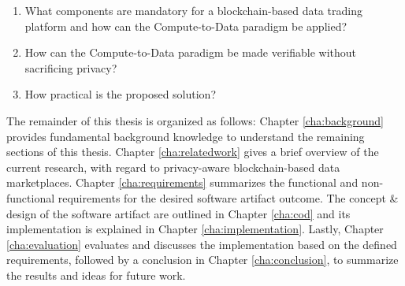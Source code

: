 \begin{enumerate}
    \item What components are mandatory for a blockchain-based data trading platform and how can the Compute-to-Data paradigm be applied?
    \item How can the Compute-to-Data paradigm be made verifiable without sacrificing privacy?
    \item How practical is the proposed solution?
\end{enumerate}

The remainder of this thesis is organized as follows: Chapter \ref{cha:background} provides fundamental background knowledge to understand the remaining sections of this thesis. Chapter \ref{cha:relatedwork} gives a brief overview of the current research, with regard to privacy-aware blockchain-based data marketplaces. Chapter \ref{cha:requirements} summarizes the functional and non-functional requirements for the desired software artifact outcome. The concept \& design of the software artifact are outlined in Chapter \ref{cha:cod} and its implementation is explained in Chapter \ref{cha:implementation}. Lastly, Chapter \ref{cha:evaluation} evaluates and discusses the implementation based on the defined requirements, followed by a conclusion in Chapter \ref{cha:conclusion}, to summarize the results and ideas for future work.